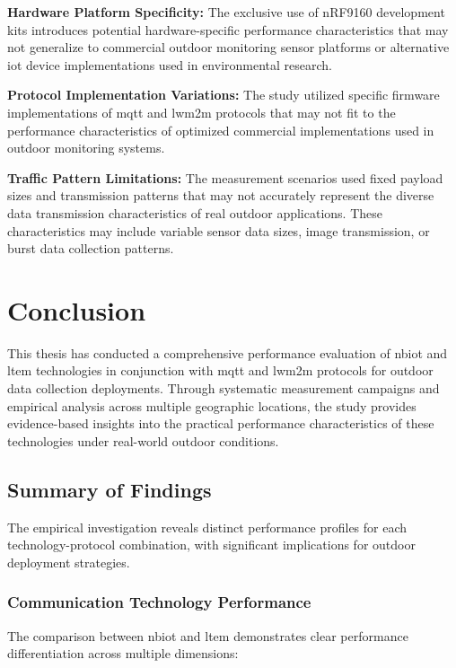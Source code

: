 \documentclass[12pt, english, openany]{book}
\begin{document}
\textbf{Hardware Platform Specificity:} The exclusive use of nRF9160 development kits introduces potential hardware-specific performance characteristics that may not generalize to commercial outdoor monitoring sensor platforms or alternative \gls{iot} device implementations used in environmental research.

\textbf{Protocol Implementation Variations:} The study utilized specific firmware implementations of \gls{mqtt} and \gls{lwm2m} protocols that may not fit to the performance characteristics of optimized commercial implementations used in outdoor monitoring systems.

\textbf{Traffic Pattern Limitations:} The measurement scenarios used fixed payload sizes and transmission patterns that may not accurately represent the diverse data transmission characteristics of real outdoor applications. These characteristics may include variable sensor data sizes, image transmission, or burst data collection patterns.

\chapter{Conclusion} \label{chap:conclusion}

This thesis has conducted a comprehensive performance evaluation of \gls{nbiot} and \gls{ltem} technologies in conjunction with \gls{mqtt} and \gls{lwm2m} protocols for outdoor data collection deployments. Through systematic measurement campaigns and empirical analysis across multiple geographic locations, the study provides evidence-based insights into the practical performance characteristics of these technologies under real-world outdoor conditions.

\section{Summary of Findings}

The empirical investigation reveals distinct performance profiles for each technology-protocol combination, with significant implications for outdoor deployment strategies.

\subsection{Communication Technology Performance}

The comparison between \gls{nbiot} and \gls{ltem} demonstrates clear performance differentiation across multiple dimensions:
\end{document}
